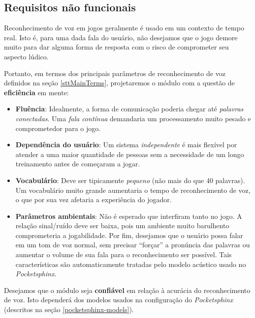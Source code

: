 
\subsection{Requisitos não funcionais}

Reconhecimento de voz em jogos geralmente é usado em um contexto de tempo real. Isto é, para uma dada fala do usuário, não desejamos que o jogo demore muito para dar alguma forma de resposta com o risco de comprometer seu aspecto lúdico.

Portanto, em termos dos principais parâmetros de reconhecimento de voz definidos na seção \ref{sttMainTerms}, projetaremos o módulo com a questão de \textbf{eficiência} em mente:

\begin{itemize}
\item \textbf{Fluência}: Idealmente, a forma de comunicação poderia chegar até \emph{palavras conectadas}. Uma \textit{fala contínua} demandaria um processamento muito pesado e comprometedor para o jogo.

\item \textbf{Dependência do usuário}: Um sistema \emph{independente} é mais flexível por atender a uma maior quantidade de pessoas sem a necessidade de um longo treinamento antes de começaram a jogar.

\item \textbf{Vocabulário}: Deve ser tipicamente \emph{pequeno} (não mais do que 40 palavras). Um vocabulário muito grande aumentaria o tempo de reconhecimento de voz, o que por sua vez afetaria a experiência do jogador.

\item \textbf{Parâmetros ambientais}: Não é esperado que interfiram tanto no jogo. A relação sinal/ruído deve ser baixa, pois um ambiente muito barulhento comprometeria a jogabilidade. Por fim, desejamos que o usuário possa falar em um tom de voz normal, sem precisar ``forçar'' a pronúncia das palavras ou aumentar o volume de sua fala para o reconhecimento ser possível. Tais características são automaticamente tratadas pelo modelo acústico usado no \textit{Pocketsphinx}.
\end{itemize}

Desejamos que o módulo seja \textbf{confiável} em relação à acurácia do reconhecimento de voz. Isto dependerá dos modelos usados na configuração do \textit{Pocketsphinx} (descritos na seção \ref{pocketsphinx-models}).

